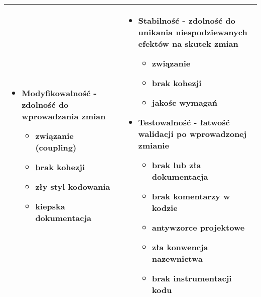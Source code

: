 \documentclass[../main.tex]{subfiles}
\begin{document}
\begin{table}[H]
\begin{center}
\begin{tabular}{| p{8cm} | p{8cm} |}
\begin{itemize}
                    \item \textbf{Modyfikowalność} - zdolność do wprowadzania zmian
                    \begin{itemize}
                        \item związanie (coupling)
                        \item brak kohezji
                        \item zły styl kodowania
                        \item kiepska dokumentacja
                    \end{itemize}
                \end{itemize}
                &
                \begin{itemize}
                    \item \textbf{Stabilność} - zdolność do unikania niespodziewanych efektów na skutek zmian
                    \begin{itemize}
                        \item związanie
                        \item brak kohezji
                        \item jakośc wymagań
                    \end{itemize}

                    \item \textbf{Testowalność} - łatwość walidacji po wprowadzonej zmianie
                    \begin{itemize}
                        \item brak lub zła dokumentacja
                        \item brak komentarzy w kodzie
                        \item antywzorce projektowe
                        \item zła konwencja nazewnictwa
                        \item brak instrumentacji kodu
                    \end{itemize}
                \end{itemize} \\
                \hline
            \end{tabular}
        \end{center}
    \end{table}
\end{document}
